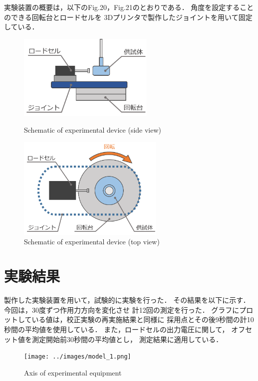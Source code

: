 \documentclass[twocolumn,a4j]{jsarticle}
\begin{document}
実験装置の概要は，以下のFig.20，Fig.21のとおりである．
角度を設定することのできる回転台とロードセルを
3Dプリンタで製作したジョイントを用いて固定している．

\begin{figure}[htbp]
    \footnotesize
    \begin{center}
        \includegraphics[width=65mm]{../images/rotation.png}
        \caption{Schematic of experimental device (side view)}
        \includegraphics[width=70mm]{../images/rotation_2.png}
        \caption{Schematic of experimental device (top view)}
    \end{center}
\end{figure}

\newpage

\section{実験結果}
製作した実験装置を用いて，試験的に実験を行った．
その結果を以下に示す．
今回は，30度ずつ作用力方向を変化させ
計12回の測定を行った．
グラフにプロットしている値は，校正実験の再実施結果と同様に
採用点とその後9秒間の計10秒間の平均値を使用している．
また，ロードセルの出力電圧に関して，
オフセット値を測定開始前30秒間の平均値とし，
測定結果に適用している．

\begin{figure}[htbp]
    \footnotesize
    \begin{center}
        \texttt{[image: ../images/model\_1.png]}
        \caption{Axis of experimental equipment}
    \end{center}
\end{figure}
\end{document}
